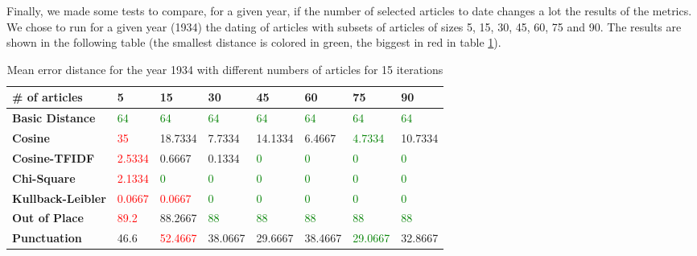 Finally, we made some tests to compare, for a given year, if the number of selected articles to date changes a lot the results of the metrics. We chose to run for a given year (1934) the dating of articles with subsets of articles of sizes 5, 15, 30, 45, 60, 75 and 90. The results are shown in the following table (the smallest distance is colored in green, the biggest in red in table \ref{table_comparison_size_articles}).
\begin{center}
    \begin{table}[h!]
        \begin{tabular}{ | p{3.3cm} | p{1.4cm} | p{1.4cm} | p{1.4cm} | p{1.4cm} | p{1.4cm} | p{1.4cm} | p{1.4cm} | }
            \hline
            \textbf{\# of articles} & \textbf{5} & \textbf{15} & \textbf{30} & \textbf{45} & \textbf{60} & \textbf{75} & \textbf{90}\\
            \hline
            \hline
            \textbf{Basic Distance} & \textcolor{green}{64} & \textcolor{green}{64} & \textcolor{green}{64} & \textcolor{green}{64} & \textcolor{green}{64} & \textcolor{green}{64} & \textcolor{green}{64} \\
            \hline
            \textbf{Cosine} & \textcolor{red}{35} & 18.7334 & 7.7334 & 14.1334 & 6.4667 & \textcolor{green}{4.7334} & 10.7334 \\
            \hline
            \textbf{Cosine-TFIDF} & \textcolor{red}{2.5334} & 0.6667 & 0.1334 & \textcolor{green}{0} & \textcolor{green}{0} & \textcolor{green}{0} & \textcolor{green}{0} \\
            \hline
            \textbf{Chi-Square} & \textcolor{red}{2.1334} & \textcolor{green}{0} & \textcolor{green}{0} & \textcolor{green}{0} & \textcolor{green}{0} & \textcolor{green}{0} & \textcolor{green}{0} \\
            \hline
            \textbf{Kullback-Leibler} & \textcolor{red}{0.0667} & \textcolor{red}{0.0667} & \textcolor{green}{0} & \textcolor{green}{0} & \textcolor{green}{0} & \textcolor{green}{0} & \textcolor{green}{0} \\
            \hline
            \textbf{Out of Place} & \textcolor{red}{89.2} & 88.2667 & \textcolor{green}{88} & \textcolor{green}{88} & \textcolor{green}{88} & \textcolor{green}{88} & \textcolor{green}{88} \\
            \hline
            \textbf{Punctuation} & 46.6 & \textcolor{red}{52.4667} & 38.0667 & 29.6667 & 38.4667 & \textcolor{green}{29.0667} & 32.8667 \\
            \hline
        \end{tabular}
        \caption{Mean error distance for the year 1934 with different numbers of articles for 15 iterations}
        \label{table_comparison_size_articles}
    \end{table}
\end{center}

